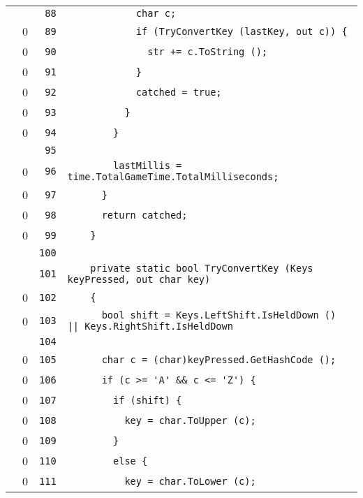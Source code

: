 \documentclass[a4paper,10pt]{article}
\begin{document}
\begin{longtable}[l]{lrrl}
\cellcolor{gray} &  & \verb~88~ & \verb~            char c;~\\
\cellcolor{red} & 0 & \verb~89~ & \verb~            if (TryConvertKey (lastKey, out c)) {~\\
\cellcolor{red} & 0 & \verb~90~ & \verb~              str += c.ToString ();~\\
\cellcolor{red} & 0 & \verb~91~ & \verb~            }~\\
\cellcolor{red} & 0 & \verb~92~ & \verb~            catched = true;~\\
\cellcolor{red} & 0 & \verb~93~ & \verb~          }~\\
\cellcolor{red} & 0 & \verb~94~ & \verb~        }~\\
\cellcolor{gray} &  & \verb~95~ & \verb~~\\
\cellcolor{red} & 0 & \verb~96~ & \verb~        lastMillis = time.TotalGameTime.TotalMilliseconds;~\\
\cellcolor{red} & 0 & \verb~97~ & \verb~      }~\\
\cellcolor{red} & 0 & \verb~98~ & \verb~      return catched;~\\
\cellcolor{red} & 0 & \verb~99~ & \verb~    }~\\
\cellcolor{gray} &  & \verb~100~ & \verb~~\\
\cellcolor{gray} &  & \verb~101~ & \verb~    private static bool TryConvertKey (Keys keyPressed, out char key)~\\
\cellcolor{red} & 0 & \verb~102~ & \verb~    {~\\
\cellcolor{red} & 0 & \verb~103~ & \verb~      bool shift = Keys.LeftShift.IsHeldDown () || Keys.RightShift.IsHeldDown ~\\
\cellcolor{gray} &  & \verb~104~ & \verb~~\\
\cellcolor{red} & 0 & \verb~105~ & \verb~      char c = (char)keyPressed.GetHashCode ();~\\
\cellcolor{red} & 0 & \verb~106~ & \verb~      if (c >= 'A' && c <= 'Z') {~\\
\cellcolor{red} & 0 & \verb~107~ & \verb~        if (shift) {~\\
\cellcolor{red} & 0 & \verb~108~ & \verb~          key = char.ToUpper (c);~\\
\cellcolor{red} & 0 & \verb~109~ & \verb~        }~\\
\cellcolor{red} & 0 & \verb~110~ & \verb~        else {~\\
\cellcolor{red} & 0 & \verb~111~ & \verb~          key = char.ToLower (c);~\\

\end{longtable}
\end{document}
